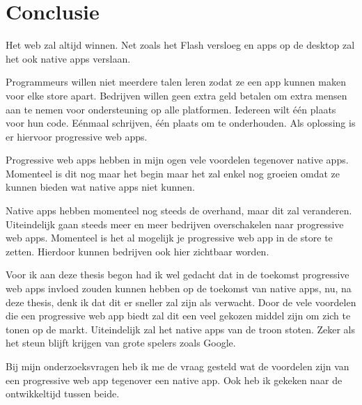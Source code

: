 
\chapter{Conclusie}
\label{ch:conclusie}


Het web zal altijd winnen. Net zoals het Flash versloeg en apps op de desktop zal het ook native apps verslaan.

Programmeurs willen niet meerdere talen leren zodat ze een app kunnen maken voor elke store apart. Bedrijven willen geen extra geld betalen om extra mensen aan te nemen voor ondersteuning op alle platformen.
Iedereen wilt één plaats voor hun code. Eénmaal schrijven, één plaats om te onderhouden. Als oplossing is er hiervoor progressive web apps.

Progressive web apps hebben in mijn ogen vele voordelen tegenover native apps. Momenteel is dit nog maar het begin maar het zal enkel nog groeien omdat ze kunnen bieden wat native apps niet kunnen. 

Native apps hebben momenteel nog steeds de overhand, maar dit zal veranderen. Uiteindelijk gaan steeds meer en meer bedrijven overschakelen naar progressive web apps. Momenteel is het al mogelijk je progressive web app in de store te zetten. Hierdoor kunnen bedrijven ook hier zichtbaar worden. 

Voor ik aan deze thesis begon had ik wel gedacht dat in de toekomst progressive web apps invloed zouden kunnen hebben op de toekomst van native apps, nu, na deze thesis, denk ik dat dit er sneller zal zijn als verwacht. Door de vele voordelen die een progressive web app biedt zal dit een veel gekozen middel zijn om zich te tonen op de markt. Uiteindelijk zal het native apps van de troon stoten. Zeker als het steun blijft krijgen van grote spelers zoals Google. 


Bij mijn onderzoeksvragen heb ik me de vraag gesteld wat de voordelen zijn van een progressive web app tegenover een native app. Ook heb ik gekeken naar de ontwikkeltijd tussen beide. 

